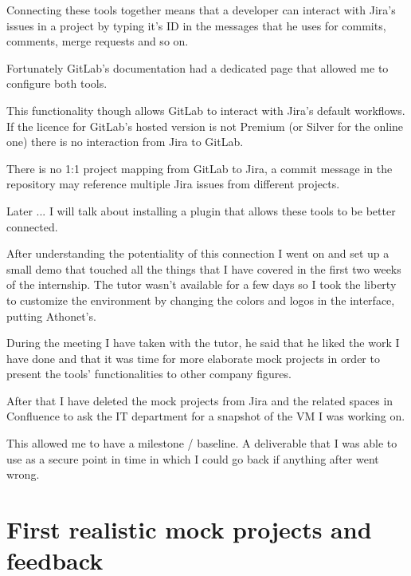 	Connecting these tools together means that a developer can interact with Jira's issues in a project by typing it's ID in the messages that he uses for commits, comments, merge requests and so on.
	
	Fortunately GitLab's documentation had a dedicated page that allowed me to configure both tools.
	
	
	This functionality though allows GitLab to interact with Jira's default workflows.	
	If the licence for GitLab's hosted version is not Premium (or Silver for the online one) there is no interaction from Jira to GitLab.
	
	
	There is no 1:1 project mapping from GitLab to Jira, a commit message in the repository may reference multiple Jira issues from different projects.
	
	Later ... I will talk about installing a plugin that allows these tools to be better connected.
	
	After understanding the potentiality of this connection I went on and set up a small demo that touched all the things that I have covered in the first two weeks of the internship.
	The tutor wasn't available for a few days so I took the liberty to customize the environment by changing the colors and logos in the interface, putting Athonet's.
	
	
	During the meeting I have taken with the tutor, he said that he liked the work I have done and that it was time for more elaborate mock projects in order to present the tools' functionalities to other company figures.
	
	After that I have deleted the mock projects from Jira and the related spaces in Confluence to ask the IT department for a snapshot of the VM I was working on.
	
	This allowed me to have a milestone / baseline.
	A deliverable that I was able to use as a secure point in time in which I could go back if anything after went wrong.
	
\section{First realistic mock projects and feedback}
	
